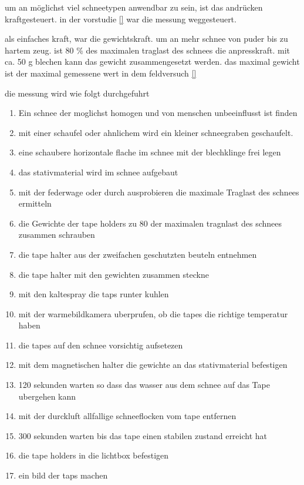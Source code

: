 um an möglichst viel schneetypen anwendbar zu sein, ist das andrücken kraftgesteuert. in der vorstudie \ref{} war die messung weggesteuert.

als einfaches kraft, war die gewichtskraft. um an mehr schnee von puder bis zu hartem zeug. ist 80 \% des maximalen traglast des schnees die anpresskraft. mit ca. 50 g blechen kann das gewicht zusammengesetzt werden. das maximal gewicht ist der maximal gemessene wert in dem feldversuch \ref{}


die messung wird wie folgt durchgefuhrt

\begin{enumerate}
\item Ein schnee der moglichst homogen und von menschen unbeeinflusst ist finden
\item mit einer schaufel oder ahnlichem wird ein kleiner schneegraben geschaufelt.
\item eine schaubere horizontale flache im schnee mit der blechklinge frei legen
\item das stativmaterial wird im schnee aufgebaut
\item mit der federwage oder durch ausprobieren die maximale Traglast des schnees ermitteln
\item die Gewichte der tape holders zu 80 der maximalen tragnlast des schnees zusammen schrauben
\item die tape halter aus der zweifachen geschutzten beuteln entnehmen
\item die tape halter mit den gewichten zusammen steckne
\item mit den kaltespray die taps runter kuhlen
\item mit der warmebildkamera uberprufen, ob die tapes die richtige temperatur haben
\item die tapes auf den schnee vorsichtig aufsetezen
\item mit dem magnetischen halter die gewichte an das stativmaterial befestigen
\item 120 sekunden warten so dass das wasser aus dem schnee auf das Tape ubergehen kann
\item mit der durckluft allfallige schneeflocken vom tape entfernen
\item 300 sekunden warten bis das tape einen stabilen zustand erreicht hat
\item die tape holders in die lichtbox befestigen
\item ein bild der taps machen
\end{enumerate}
